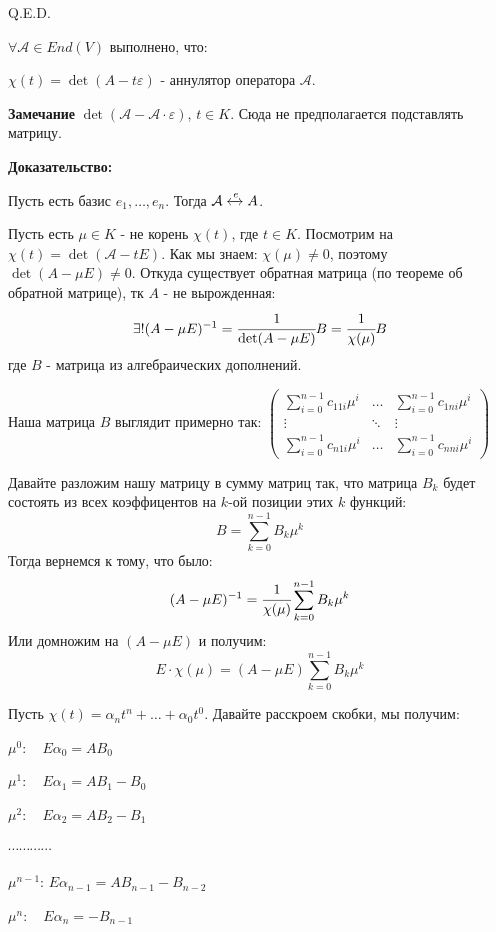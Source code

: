     \hfill Q.E.D.


$\forall \mathcal{A} \in End(V)$ выполнено, что:

$\chi(t)  = \det (A -t \varepsilon)$ - аннулятор оператора $\mathcal{A}$.

\textbf{Замечание} $\det (\mathcal{A} - \mathcal{A}\cdot \varepsilon)$, $t\in K$. Сюда не предполагается подставлять матрицу.

\textbf{Доказательство:}

Пусть есть базис $e_1,\ldots,e_n$. Тогда $\mathcal{A} \xleftrightarrow{e}A$.

Пусть есть $\mu \in K$ -  не корень $\chi(t)$, где $t \in K$. Посмотрим на $\chi (t) = \det (\mathcal{A} - tE )$. Как мы знаем:
$\chi(\mu) \neq 0$, поэтому $\det (A - \mu E) \neq 0$. Откуда существует обратная матрица (по теореме об обратной матрице), тк $A$ - не вырожденная:
$$\exists!(A-\mu E)^{-1} = \cfrac{1}{\det (A- \mu E)}B = \cfrac{1}{\chi(\mu)}B$$
где $B$ - матрица из алгебраических дополнений.

Наша матрица $B$ выглядит примерно так: $\begin{pmatrix}
    \sum\limits_{i=0}^{n-1}c_{11i}\mu^i & \ldots& \sum\limits_{i=0}^{n-1}c_{1ni}\mu^i\\
    \vdots &\ddots& \vdots \\
    \sum\limits_{i=0}^{n-1}c_{n1i}\mu^i& \ldots& \sum\limits_{i=0}^{n-1}c_{nni}\mu^i
\end{pmatrix}$

Давайте разложим нашу матрицу в сумму матриц так, что матрица $B_k$ будет состоять из всех коэффицентов на $k$-ой позиции этих $k$ функций:
$$B = \sum\limits_{k=0}^{n-1} B_k \mu^k $$
Тогда вернемся  к тому, что было:
$$(A - \mu E)^{-1} = \cfrac{1}{\chi(\mu)}\sum\limits_{k=0}^{n-1} B_k \mu^k$$
Или домножим на $(A - \mu E)$  и получим:
$$E\cdot\chi(\mu) = (A - \mu E) \sum\limits_{k=0}^{n-1} B_k \mu^k$$

Пусть $\chi(t) = \alpha_nt^n + \ldots+\alpha_0t^0$. Давайте расскроем скобки, мы получим:

\hfill
\begin{minipage}[h]{0.6\linewidth}
$\mu^0:\quad E \alpha_0 = AB_0$

$\mu^1:\quad E \alpha_1 = AB_1 - B_0$

$\mu^2:\quad E \alpha_2 = AB_2 - B_1$

$\cdots \cdots \cdots \cdots$

$\mu^{n-1}:\,E \alpha_{n-1} = AB_{n-1} - B_{n-2}$

$\mu^n: \quad E \alpha_n = -B_{n-1}$
\end{minipage}

